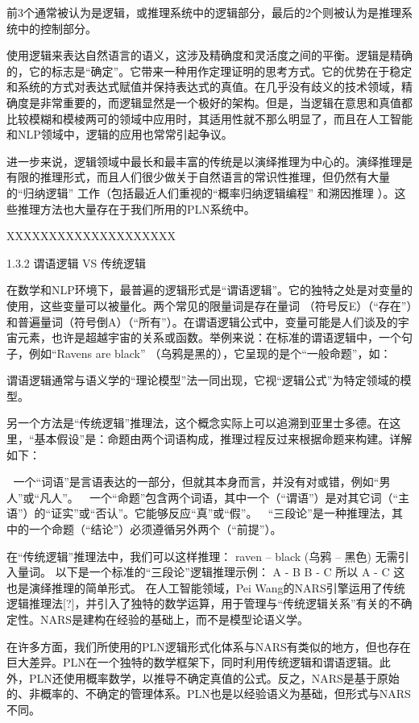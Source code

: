 \noindent 前3个通常被认为是逻辑，或推理系统中的逻辑部分，最后的2个则被认为是推理系统中的控制部分。

使用逻辑来表达自然语言的语义，这涉及精确度和灵活度之间的平衡。逻辑是精确的，它的标志是“确定”。它带来一种用作定理证明的思考方式。它的优势在于稳定和系统的方式对表达式赋值并保持表达式的真值。在几乎没有歧义的技术领域，精确度是非常重要的，而逻辑显然是一个极好的架构。但是，当逻辑在意思和真值都比较模糊和模棱两可的领域中应用时，其适用性就不那么明显了，而且在人工智能和NLP领域中，逻辑的应用也常常引起争议。

进一步来说，逻辑领域中最长和最丰富的传统是以演绎推理为中心的。演绎推理是有限的推理形式，而且人们很少做关于自然语言的常识性推理，但仍然有大量的“归纳逻辑”\cite{Muggleton1994} \cite{Holland1989}工作（包括最近人们重视的“概率归纳逻辑编程” \cite{Riguzzi2014}和溯因推理\cite{Queiroz2005} \cite{Menzies1996}）。这些推理方法也大量存在于我们所用的PLN系统中。

XXXXXXXXXXXXXXXXXXXX

1.3.2 谓语逻辑 VS 传统逻辑

在数学和NLP环境下，最普遍的逻辑形式是“谓语逻辑”。它的独特之处是对变量的使用，这些变量可以被量化。两个常见的限量词是存在量词 （符号反E）（“存在”）和普遍量词（符号倒A）（“所有”）。在谓语逻辑公式中，变量可能是人们谈及的宇宙元素，也许是超越宇宙的关系或函数。举例来说：在标准的谓语逻辑中，一个句子，例如“Ravens are black” （乌鸦是黑的），它呈现的是个“一般命题”，如：



谓语逻辑通常与语义学的“理论模型”法一同出现，它视“逻辑公式”为特定领域的模型。


另一个方法是“传统逻辑”推理法，这个概念实际上可以追溯到亚里士多德。在这里，“基本假设”是：命题由两个词语构成，推理过程反过来根据命题来构建。详解如下：

	一个“词语”是言语表达的一部分，但就其本身而言，并没有对或错，例如“男人”或“凡人”。
	一个“命题”包含两个词语，其中一个（“谓语”）是对其它词（“主语”）的“证实”或“否认”。它能够反应“真”或“假”。
	“三段论”是一种推理法，其中的一个命题（“结论”）必须遵循另外两个（“前提”）。

在“传统逻辑”推理法中，我们可以这样推理：
raven – black (乌鸦 – 黑色)
无需引入量词。
以下是一个标准的“三段论”逻辑推理示例：
A - B
B - C
所以
A - C
这也是演绎推理的简单形式。
在人工智能领域，Pei Wang的NARS引擎运用了传统逻辑推理法[?]，并引入了独特的数学运算，用于管理与“传统逻辑关系”有关的不确定性。NARS是建构在经验的基础上，而不是模型论语义学。

在许多方面，我们所使用的PLN逻辑形式化体系与NARS有类似的地方，但也存在巨大差异。PLN在一个独特的数学框架下，同时利用传统逻辑和谓语逻辑。此外，PLN还使用概率数学，以推导不确定真值的公式。反之，NARS是基于原始的、非概率的、不确定的管理体系。PLN也是以经验语义为基础，但形式与NARS不同。


